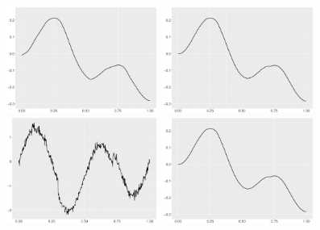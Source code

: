 \documentclass{beamer}
\begin{document}
\begin{frame}
\begin{figure}
\centering
\includegraphics[width=5cm,height=3.5cm]{Chapters/02TractorSplineTheory/plot/ggplot/ggHeaviSineGamma}
\includegraphics[width=5cm,height=3.5cm]{Chapters/02TractorSplineTheory/plot/ggplot/ggHeaviSineTractorAPT}\\
\includegraphics[width=5cm,height=3.5cm]{Chapters/02TractorSplineTheory/plot/ggplot/ggHeaviSineTractorVelocity}
\includegraphics[width=5cm,height=3.5cm]{Chapters/02TractorSplineTheory/plot/ggplot/ggHeaviSineTractor}
\end{figure}
\end{frame}
\end{document}
